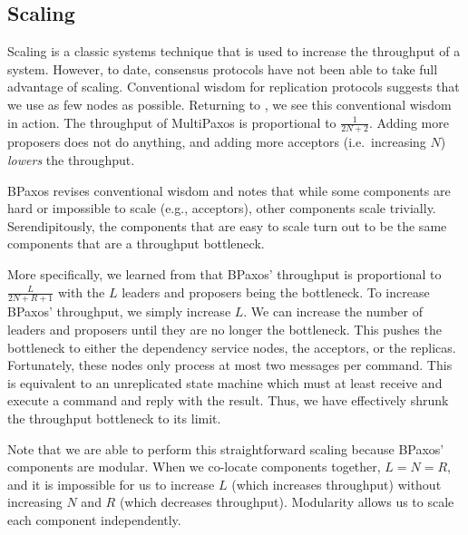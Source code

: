 \subsection{Scaling}
Scaling is a classic systems technique that is used to increase the throughput
of a system. However, to date, consensus protocols have not been able to take
full advantage of scaling. Conventional wisdom for replication protocols
suggests that we use as few nodes as possible. Returning to
, we see this conventional wisdom in action. The
throughput of MultiPaxos is proportional to $\frac{1}{2N+2}$. Adding more
proposers does not do anything, and adding more acceptors (i.e.\ increasing
$N$) \emph{lowers} the throughput.

BPaxos revises conventional wisdom and notes that while some components are
hard or impossible to scale (e.g., acceptors), other components scale
trivially. Serendipitously, the components that are easy to scale turn out to
be the same components that are a throughput bottleneck.

More specifically, we learned from  that BPaxos'
throughput is proportional to $\frac{L}{2N+R+1}$ with the $L$ leaders and
proposers being the bottleneck. To increase BPaxos' throughput, we simply
increase $L$. We can increase the number of leaders and proposers until they
are no longer the bottleneck. This pushes the bottleneck to either the
dependency service nodes, the acceptors, or the replicas. Fortunately, these
nodes only process at most two messages per command. This is equivalent to an
unreplicated state machine which must at least receive and execute a command
and reply with the result. Thus, we have effectively shrunk the throughput
bottleneck to its limit.

Note that we are able to perform this straightforward scaling because BPaxos'
components are modular. When we co-locate components together, $L=N=R$,
and it is impossible for us to increase $L$ (which increases throughput) without
increasing $N$ and $R$ (which decreases throughput). Modularity allows us
to scale each component independently.
